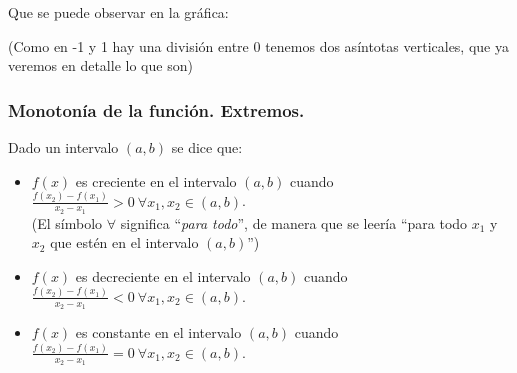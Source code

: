 \documentclass[a4paper,11pt,answers]{exam}
\begin{document}
\begin{questions}
\begin{solution}
Que se puede observar en la gráfica:
\begin{center}
\end{center}
(Como en -1 y 1 hay una división entre 0 tenemos dos asíntotas verticales, que ya veremos en detalle lo que son)
\end{solution}
\end{questions}

\subsubsection{Monotonía de la función. Extremos.}
Dado un intervalo $(a, b)$ se dice que:
\begin{itemize}
	\item $f(x)$ es creciente en el intervalo $(a, b)$ cuando $\frac{f(x_2)-f(x_1)}{x_2 - x_1}>0\ \forall x_1, x_2 \in (a,b)$.\\
	(El símbolo $\boldsymbol{\forall}$ significa ``\textit{para todo}'', de manera que se leería ``para todo $x_1$ y $x_2$ que estén en el intervalo $(a,b)$'')
	\item $f(x)$ es decreciente en el intervalo $(a, b)$ cuando $\frac{f(x_2)-f(x_1)}{x_2 - x_1}<0\ \forall x_1, x_2 \in (a,b)$.
	\item $f(x)$ es constante en el intervalo $(a, b)$ cuando $\frac{f(x_2)-f(x_1)}{x_2 - x_1}=0\ \forall x_1, x_2 \in (a,b)$.
\end{itemize}
\end{document}
